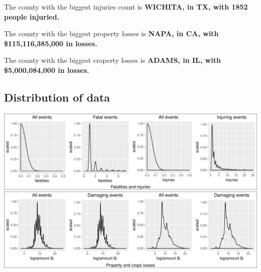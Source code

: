 \documentclass[]{article}
\begin{document}
The county with the biggest injuries count is \textbf{WICHITA, in TX,
with 1852 people injuried.}

The county with the biggest property losses is \textbf{NAPA, in CA, with
\$115,116,385,000 in losses.}

The county with the biggest croperty losses is \textbf{ADAMS, in IL,
with \$5,000,084,000 in losses.}

\subsection{Distribution of data}\label{distribution-of-data}

\includegraphics{readme_files/figure-latex/distribution-1.pdf}
\includegraphics{readme_files/figure-latex/distribution-2.pdf}
\end{document}
